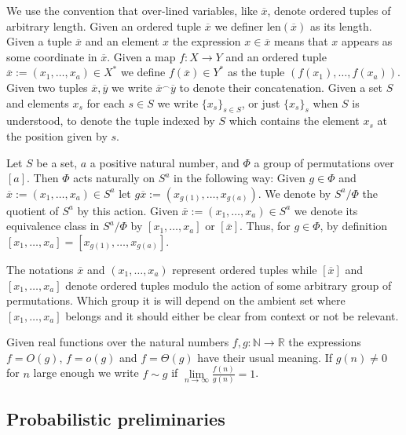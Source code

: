 \documentclass[12pt,notitlepage,a4paper]{article}
\theoremstyle{definition}
\newcommand{\R}{\mathbb{R}}
\newcommand{\N}{\mathbb{N}}
\newcommand{\Ln}{\lim\limits_{n\to \infty}}
\newcommand{\len}{\mathrm{len}}
\begin{document}
We use the convention that over-lined variables, 
like $\overline{x}$, denote ordered tuples of arbitrary length.
Given an ordered tuple $\overline{x}$
we definer $\len(\overline{x})$ as its length. 
Given a tuple $\overline{x}$ and an element $x$ the expression
$x\in \overline{x}$ means that $x$ appears as some coordinate
in $\overline{x}$. 
Given a map $f:X\rightarrow Y$ and 
an ordered tuple $\overline{x}:=(x_1,\dots,x_a)\in X^*$ 
we define $f(\overline{x})\in Y^*$ as the tuple 
$(f(x_1),\dots,f(x_a))$.
Given two tuples $\overline{x},\overline{y}$
we write $\overline{x}^\smallfrown \overline{y}$ to denote their 
concatenation. Given a set $S$ and elements $x_s$ for each $s\in S$
we write $\{x_s\}_{s\in S}$, or just $\{x_s\}_s$ when $S$ is understood,
to denote the tuple indexed by $S$ which
contains the element $x_s$ at the position given by $s$. 
\par
Let $S$ be a set, $a$ a positive natural number, 
and $\Phi$ a group of permutations over 
$[a]$. Then $\Phi$ acts naturally on
$S^a$ in the following way: Given $g\in \Phi$ and
$\overline{x}:=(x_1,\dots,x_a)\in S^a$ let 
$g  \overline{x}:=(x_{g(1)},\dots,x_{g(a)})$. 
We denote by $S^a/\Phi$ the quotient
of $S^a$ by this action. Given
$\overline{x}:=(x_1,\dots, x_a)\in S^a$ we denote its equivalence
class in $S^a/\Phi$ by $[x_1,\dots,x_a]$ or $[\overline{x}]$.
Thus, for
$g\in \Phi$, by definition $[x_1,\dots,x_a]=[x_{g(1)}
,\dots,x_{g(a)}]$. \par
The notations $\overline{x}$ and
$(x_1,\dots, x_a)$ 
represent
ordered tuples while 
$[\overline{x}]$ and
$[x_1,\dots,x_a]$ denote ordered tuples modulo the
action of some arbitrary group of permutations. Which group it is
will depend on the ambient set where $[x_1,\dots,x_a]$ belongs
and it should either be clear from context or not be relevant.\par

Given real functions over the natural numbers 
$f,g:\N \rightarrow \R$ the expressions $f=O(g)$,
$f=o(g)$ and $f=\Theta(g)$ have their usual meaning.
If $g(n)\neq 0$ for $n$ large enough 
we write $f\sim g$ if $\Ln \frac{f(n)}{g(n)}=1$. \par


%
\subsection{Probabilistic preliminaries}
\end{document}
